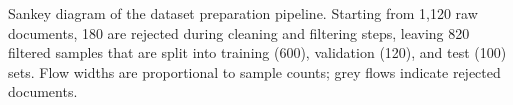 \caption{Sankey diagram of the dataset preparation pipeline.
Starting from 1{,}120 raw documents, 180 are rejected during cleaning and filtering steps, leaving 820 filtered samples
that are split into training (600), validation (120), and test (100) sets.
Flow widths are proportional to sample counts; grey flows indicate rejected documents.}
